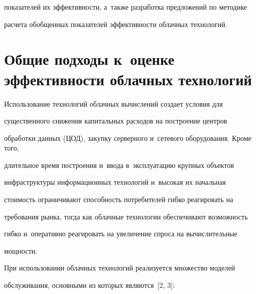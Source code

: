 показателей их эффективности, а~также разработка предложений по методике 

расчета обобщенных показателей эффективности облачных технологий.

  

\section{Общие подходы к~оценке эффективности облачных технологий}



  Использование технологий облачных вычислений создает условия для 

существенного снижения капитальных расходов на построение центров 

обработки данных (ЦОД), закупку серверного и~сетевого оборудования. Кроме того, 

длительное время построения и~ввода в~эксплуатацию крупных объектов 

инфраструктуры информационных технологий и~высокая их начальная 

стоимость ограничивают способность потребителей гибко реагировать на 

требования рынка, тогда как облачные технологии обеспечивают возможность 

гибко и~оперативно реагировать на увеличение спроса на вычислительные 

мощности.

  

  При использовании облачных технологий реализуется множество моделей 

обслуживания, основными из которых являются~[2, 3]:

